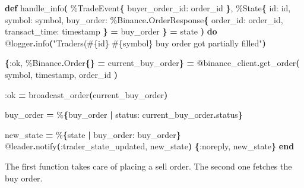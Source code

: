 \documentclass[
  oneside]{book}
\newenvironment{Shaded}{\begin{snugshade}}{\end{snugshade}}
\newcommand{\ConstantTok}[1]{\textcolor[rgb]{0.56,0.35,0.01}{#1}}
\newcommand{\FunctionTok}[1]{\textcolor[rgb]{0.13,0.29,0.53}{\textbf{#1}}}
\newcommand{\KeywordTok}[1]{\textcolor[rgb]{0.13,0.29,0.53}{\textbf{#1}}}
\newcommand{\NormalTok}[1]{#1}
\newcommand{\OperatorTok}[1]{\textcolor[rgb]{0.81,0.36,0.00}{\textbf{#1}}}
\newcommand{\OtherTok}[1]{\textcolor[rgb]{0.56,0.35,0.01}{#1}}
\newcommand{\StringTok}[1]{\textcolor[rgb]{0.31,0.60,0.02}{#1}}
\newcommand{\VariableTok}[1]{\textcolor[rgb]{0.00,0.00,0.00}{#1}}
\begin{document}
\begin{Shaded}
\begin{Highlighting}[]
  \KeywordTok{def}\NormalTok{ handle\_info}\FunctionTok{(}
\NormalTok{        \%}\ConstantTok{TradeEvent}\FunctionTok{\{}
          \VariableTok{buyer\_order\_id:}\NormalTok{ order\_id}
        \FunctionTok{\}}\NormalTok{,}
\NormalTok{        \%}\ConstantTok{State}\FunctionTok{\{}
          \VariableTok{id:}\NormalTok{ id,}
          \VariableTok{symbol:}\NormalTok{ symbol,}
          \VariableTok{buy\_order:}
\NormalTok{            \%}\ConstantTok{Binance}\OperatorTok{.}\ConstantTok{OrderResponse}\FunctionTok{\{}
              \VariableTok{order\_id:}\NormalTok{ order\_id,}
              \VariableTok{transact\_time:}\NormalTok{ timestamp}
            \FunctionTok{\}} \OperatorTok{=}\NormalTok{ buy\_order}
        \FunctionTok{\}} \OperatorTok{=}\NormalTok{ state}
      \FunctionTok{)} \KeywordTok{do}
    \OtherTok{@logger}\OperatorTok{.}\NormalTok{info}\FunctionTok{(}\StringTok{"Trader\textquotesingle{}s(}\OtherTok{\#\{}\NormalTok{id}\OtherTok{\}}\StringTok{ }\OtherTok{\#\{}\NormalTok{symbol}\OtherTok{\}}\StringTok{ buy order got partially filled"}\FunctionTok{)}

    \FunctionTok{\{}\VariableTok{:ok}\NormalTok{, \%}\ConstantTok{Binance}\OperatorTok{.}\ConstantTok{Order}\FunctionTok{\{\}} \OperatorTok{=}\NormalTok{ current\_buy\_order}\FunctionTok{\}} \OperatorTok{=}
      \OtherTok{@binance\_client}\OperatorTok{.}\NormalTok{get\_order}\FunctionTok{(}
\NormalTok{        symbol,}
\NormalTok{        timestamp,}
\NormalTok{        order\_id}
      \FunctionTok{)}

    \VariableTok{:ok} \OperatorTok{=}\NormalTok{ broadcast\_order}\FunctionTok{(}\NormalTok{current\_buy\_order}\FunctionTok{)}

\NormalTok{    buy\_order }\OperatorTok{=}\NormalTok{ \%}\FunctionTok{\{}\NormalTok{buy\_order }\OperatorTok{|} \VariableTok{status:}\NormalTok{ current\_buy\_order}\OperatorTok{.}\NormalTok{status}\FunctionTok{\}}

\NormalTok{    new\_state }\OperatorTok{=}\NormalTok{ \%}\FunctionTok{\{}\NormalTok{state }\OperatorTok{|} \VariableTok{buy\_order:}\NormalTok{ buy\_order}\FunctionTok{\}}
    \OtherTok{@leader}\OperatorTok{.}\NormalTok{notify}\FunctionTok{(}\VariableTok{:trader\_state\_updated}\NormalTok{, new\_state}\FunctionTok{)}
    \FunctionTok{\{}\VariableTok{:noreply}\NormalTok{, new\_state}\FunctionTok{\}}
  \KeywordTok{end}
\end{Highlighting}
\end{Shaded}

The first function takes care of placing a sell order. The second one fetches the buy order.
\end{document}
